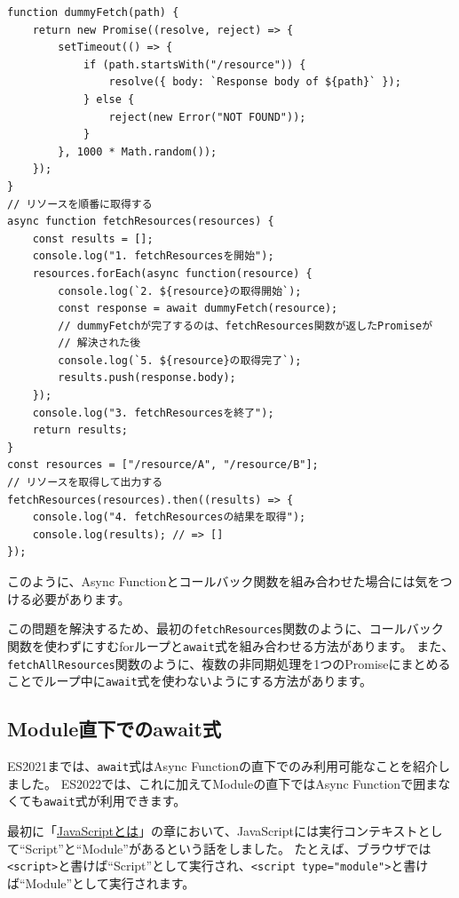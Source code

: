 \begin{lstlisting}
function dummyFetch(path) {
    return new Promise((resolve, reject) => {
        setTimeout(() => {
            if (path.startsWith("/resource")) {
                resolve({ body: `Response body of ${path}` });
            } else {
                reject(new Error("NOT FOUND"));
            }
        }, 1000 * Math.random());
    });
}
// リソースを順番に取得する
async function fetchResources(resources) {
    const results = [];
    console.log("1. fetchResourcesを開始");
    resources.forEach(async function(resource) {
        console.log(`2. ${resource}の取得開始`);
        const response = await dummyFetch(resource);
        // dummyFetchが完了するのは、fetchResources関数が返したPromiseが
        // 解決された後
        console.log(`5. ${resource}の取得完了`);
        results.push(response.body);
    });
    console.log("3. fetchResourcesを終了");
    return results;
}
const resources = ["/resource/A", "/resource/B"];
// リソースを取得して出力する
fetchResources(resources).then((results) => {
    console.log("4. fetchResourcesの結果を取得");
    console.log(results); // => []
});
\end{lstlisting}

このように、Async
Functionとコールバック関数を組み合わせた場合には気をつける必要があります。

この問題を解決するため、最初の\texttt{fetchResources}関数のように、コールバック関数を使わずにすむforループと\texttt{await}式を組み合わせる方法があります。
また、\texttt{fetchAllResources}関数のように、複数の非同期処理を1つのPromiseにまとめることでループ中に\texttt{await}式を使わないようにする方法があります。

\hypertarget{top-level-await-in-module}{%
\subsection[Module直下での\texttt{await}式]{Module直下でのawait式\,\protect{}}\label{top-level-await-in-module}}

ES2021までは、\texttt{await}式はAsync Functionの直下でのみ利用可能なことを紹介しました。
ES2022では、これに加えてModuleの直下ではAsync Functionで囲まなくても\texttt{await}式が利用できます。

最初に「\hyperlink{what-is-javascript}{JavaScriptとは}」の章において、JavaScriptには実行コンテキストとして``Script''と``Module''があるという話をしました。
たとえば、ブラウザでは\texttt{<script>}と書けば``Script''として実行され、\texttt{<script type="module">}と書けば``Module''として実行されます。

